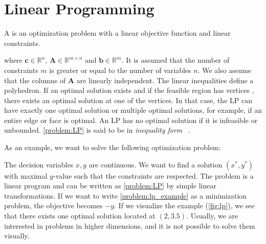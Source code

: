 \section{Linear Programming} \label{section:Linear Programming}
A  is an optimization problem with a linear objective function and linear constraints.
 where $\mathbf c \in \mathbb{R}^n$, $ \mathbf A \in \mathbb{R}^{m \times n}$ and $\mathbf b \in \mathbb{R}^m$. It is assumed that the number of constraints $m$ is greater or equal to the number of variables $n$. %
We also assume that the columns of $\mathbf A$ are linearly independent.%
The linear inequalities define a polyhedron. If an optimal solution exists and if the feasible region has vertices%
, there exists an optimal solution at one of the vertices. In that case, the LP can have exactly one optimal solution or multiple optimal solutions, for example, if an entire edge or face is optimal. An LP has no optimal solution if it is infeasible or unbounded.
\cref{problem:LP} is said to be in \textit{inequality form}%
 ~\cite{boyd_stephen_convex_2004}.

As an example, we want to solve the following optimization problem: 
The decision variables $x, y$ are continuous. We want to find a solution $(x^*, y^*)$ with maximal $y$-value such that the constraints are respected. The problem is a linear program and can be written as \cref{problem:LP} by simple linear transformations. If we want to write \cref{problem:lp_example} as a minimization problem, the objective becomes $-y$. If we visualize the example (\cref{fig:lp}), we see that there exists one optimal solution located at $(2,3.5)$. Usually, we are interested in problems in higher dimensions, and it is not possible to solve them visually.

